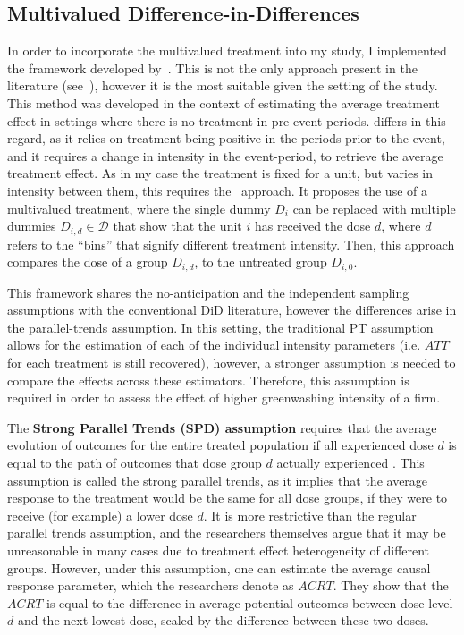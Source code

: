 \documentclass[12pt]{article}
\begin{document}
\subsection{Multivalued Difference-in-Differences}

In order to incorporate the multivalued treatment into my study, I implemented the framework developed by~\textcite{callawayDifferenceinDifferencesContinuousTreatment2025}. This is not the only approach present in the literature (see~\cite{dechaisemartinDifferenceinDifferenceEstimatorsContinuous2024}), however it is the most suitable given the setting of the study. This method was developed in the context of estimating the average treatment effect in settings where there is no treatment in pre-event periods.\@ \citeauthor{dechaisemartinDifferenceinDifferenceEstimatorsContinuous2024} differs in this regard, as it relies on treatment being positive in the periods prior to the event, and it requires a change in intensity in the event-period, to retrieve the average treatment effect. As in my case the treatment is fixed for a unit, but varies in intensity between them, this requires the~\textcite{callawayDifferenceinDifferencesContinuousTreatment2025} approach. It proposes the use of a multivalued treatment, where the single dummy $D_i$ can be replaced with multiple dummies $D_{i,d} \in \mathcal{D}$ that show that the unit $i$ has received the dose $d$, where $d$ refers to the ``bins'' that signify different treatment intensity. Then, this approach compares the dose of a group $D_{i,d}$, to the untreated group $D_{i,0}$.

This framework shares the no-anticipation and the independent sampling assumptions with the conventional DiD literature, however the differences arise in the parallel-trends assumption. In this setting, the traditional PT assumption allows for the estimation of each of the individual intensity parameters (i.e. $ATT$ for each treatment is still recovered), however, a stronger assumption is needed to compare the effects across these estimators. Therefore, this assumption is required in order to assess the effect of higher greenwashing intensity of a firm.  

The \textbf{Strong Parallel Trends (SPD) assumption} requires that the average evolution of  outcomes for the entire treated population if all experienced dose $d$ is equal to the path of outcomes that dose group $d$ actually experienced \parencite{callawayDifferenceinDifferencesContinuousTreatment2025}. This assumption is called the strong parallel trends, as it implies that the average response to the treatment would be the same for all dose groups, if they were to receive (for example) a lower dose $d$. It is more restrictive than the regular parallel trends assumption, and the researchers themselves argue that it may be unreasonable in many cases due to treatment effect heterogeneity of different groups. However, under this assumption, one can estimate the average causal response parameter, which the researchers denote as $ACRT$. They show that the $ACRT$ is equal to the difference in average potential outcomes between dose level $d$ and the next lowest dose, scaled by the difference between these two doses. 
\end{document}
